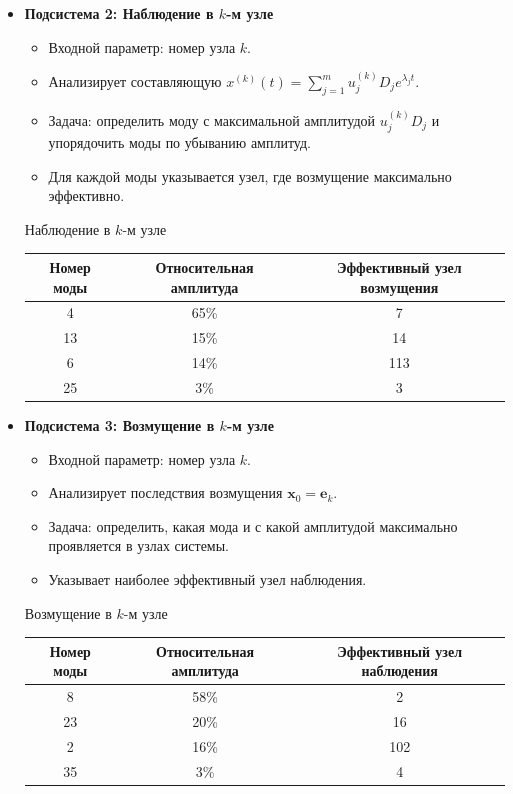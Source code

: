 \begin{itemize}
		\item \textbf{Подсистема 2: Наблюдение в $k$-м узле}
		\begin{itemize}
			\item Входной параметр: номер узла $k$.
			\item Анализирует составляющую $x^{(k)}(t) = \sum_{j=1}^m u_j^{(k)} D_j e^{\lambda_j t}$.
			\item Задача: определить моду с максимальной амплитудой $u_j^{(k)} D_j$ и упорядочить моды по убыванию амплитуд.
			\item Для каждой моды указывается узел, где возмущение максимально эффективно.
		\end{itemize}
		\begin{table}[H]
			\centering
			{\small Наблюдение в $k$-м узле}
			\par
			\begin{tabular}{c | c | c}
				\toprule
				Номер моды & Относительная амплитуда & Эффективный узел возмущения \\
				\midrule
				4 & 65\% & 7 \\
				13 & 15\% & 14 \\
				6 & 14\% & 113 \\
				25 & 3\% & 3 \\
				\bottomrule
			\end{tabular}
		\end{table}
		
		\item \textbf{Подсистема 3: Возмущение в $k$-м узле}
		\begin{itemize}
			\item Входной параметр: номер узла $k$.
			\item Анализирует последствия возмущения $\mathbf{x}_0 = \mathbf{e}_k$.
			\item Задача: определить, какая мода и с какой амплитудой максимально проявляется в узлах системы.
			\item Указывает наиболее эффективный узел наблюдения.
		\end{itemize}
		\begin{table}[H]
			\centering
			{\small Возмущение в $k$-м узле}
			\par
			\begin{tabular}{c | c | c}
				\toprule
				Номер моды & Относительная амплитуда & Эффективный узел наблюдения \\
				\midrule
				8 & 58\% & 2 \\
				23 & 20\% & 16 \\
				2 & 16\% & 102 \\
				35 & 3\% & 4 \\
				\bottomrule
			\end{tabular}
		\end{table}
	\end{itemize}
	
